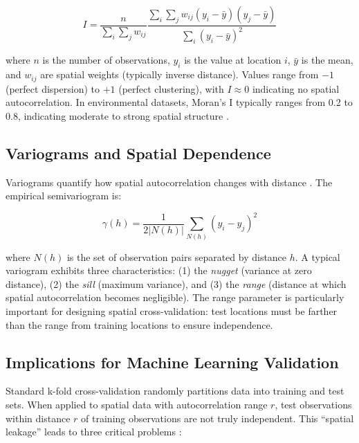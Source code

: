 \documentclass[review,12pt]{elsarticle}
\begin{document}
\begin{equation}
I = \frac{n}{\sum_{i}\sum_{j} w_{ij}} \frac{\sum_{i}\sum_{j} w_{ij}(y_i - \bar{y})(y_j - \bar{y})}{\sum_{i}(y_i - \bar{y})^2}
\end{equation}

where $n$ is the number of observations, $y_i$ is the value at location $i$, $\bar{y}$ is the mean, and $w_{ij}$ are spatial weights (typically inverse distance). Values range from $-1$ (perfect dispersion) to $+1$ (perfect clustering), with $I \approx 0$ indicating no spatial autocorrelation. In environmental datasets, Moran's I typically ranges from 0.2 to 0.8, indicating moderate to strong spatial structure \citep{goovaerts1997geostatistics}.

\subsection{Variograms and Spatial Dependence}

Variograms quantify how spatial autocorrelation changes with distance \citep{matheron1963principles}. The empirical semivariogram is:

\begin{equation}
\gamma(h) = \frac{1}{2|N(h)|} \sum_{N(h)} (y_i - y_j)^2
\end{equation}

where $N(h)$ is the set of observation pairs separated by distance $h$. A typical variogram exhibits three characteristics: (1) the \textit{nugget} (variance at zero distance), (2) the \textit{sill} (maximum variance), and (3) the \textit{range} (distance at which spatial autocorrelation becomes negligible). The range parameter is particularly important for designing spatial cross-validation: test locations must be farther than the range from training locations to ensure independence.

\subsection{Implications for Machine Learning Validation}

Standard k-fold cross-validation randomly partitions data into training and test sets. When applied to spatial data with autocorrelation range $r$, test observations within distance $r$ of training observations are not truly independent. This ``spatial leakage'' leads to three critical problems \citep{roberts2017cross}:
\end{document}
